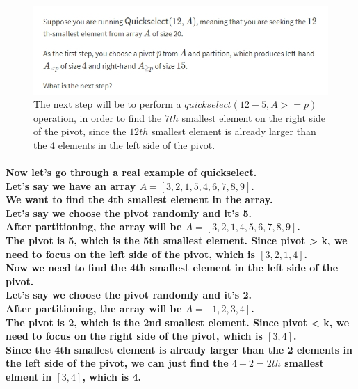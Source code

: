 \documentclass{article}
\begin{document}
\begin{figure}[H]
    \includegraphics[width=\textwidth]{quickselectlittlequiz.png}
    \caption{The next step will be to perform a $quickselect(12-5,A>=p)$ operation,
    in order to find the $7th$ smallest element on the right side of the pivot,
    since the $12th$ smallest element is already larger than the 4 elements
    in the left side of the pivot.\\}
\end{figure}

\paragraph{Now let's go through a real example of quickselect.\\
Let's say we have an array $A = [3,2,1,5,4,6,7,8,9]$.\\
We want to find the 4th smallest element in the array.\\
Let's say we choose the pivot randomly and it's 5.\\
After partitioning, the array will be $A = [3,2,1,4,5,6,7,8,9]$.\\
The pivot is 5, which is the 5th smallest element. Since pivot > k,
we need to focus on the left side of the pivot, which is $[3,2,1,4]$.\\
Now we need to find the 4th smallest element in the left side of the pivot.\\
Let's say we choose the pivot randomly and it's 2.\\
After partitioning, the array will be $A = [1,2,3,4]$.\\
The pivot is 2, which is the 2nd smallest element. Since pivot < k,
we need to focus on the right side of the pivot, which is $[3,4]$.\\
Since the 4th smallest element is already larger than the 2 elements 
in the left side of the pivot, we can just find the $4-2=2th$ smallest elment in
$[3,4]$, which is 4.\\}
\end{document}
